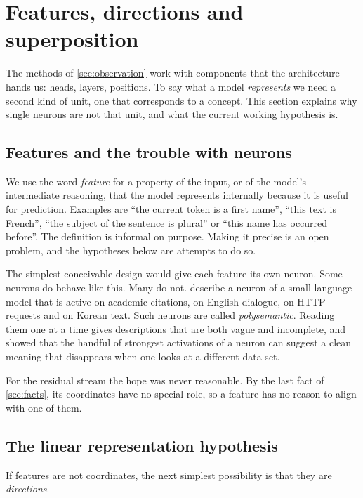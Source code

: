 \section{Features, directions and superposition}
\label{sec:features}

The methods of \cref{sec:observation} work with components that the architecture hands us: heads, layers,
positions. To say what a model \emph{represents} we need a second kind of unit, one that corresponds to a
concept. This section explains why single neurons are not that unit, and what the current working hypothesis
is.

\subsection{Features and the trouble with neurons}

We use the word \emph{feature} for a property of the input, or of the model's intermediate reasoning, that the
model represents internally because it is useful for prediction. Examples are ``the current token is a first
name'', ``this text is French'', ``the subject of the sentence is plural'' or ``this name has occurred before''.
The definition is informal on purpose. Making it precise is an open problem, and the hypotheses below are
attempts to do so.

The simplest conceivable design would give each feature its own neuron. Some neurons do behave like this. Many
do not. \citet{bricken2023monosemanticity} describe a neuron of a small language model that is active on
academic citations, on English dialogue, on HTTP requests and on Korean text. Such neurons are called
\emph{polysemantic}. Reading
them one at a time gives descriptions that are both vague and incomplete, and \citet{bolukbasi2021interpretability}
showed that the handful of strongest activations of a neuron can suggest a clean meaning that disappears when
one looks at a different data set.

For the residual stream the hope was never reasonable. By the last fact of \cref{sec:facts}, its coordinates
have no special role, so a feature has no reason to align with one of them.

\subsection{The linear representation hypothesis}
\label{sec:lrh}

If features are not coordinates, the next simplest possibility is that they are \emph{directions}.

